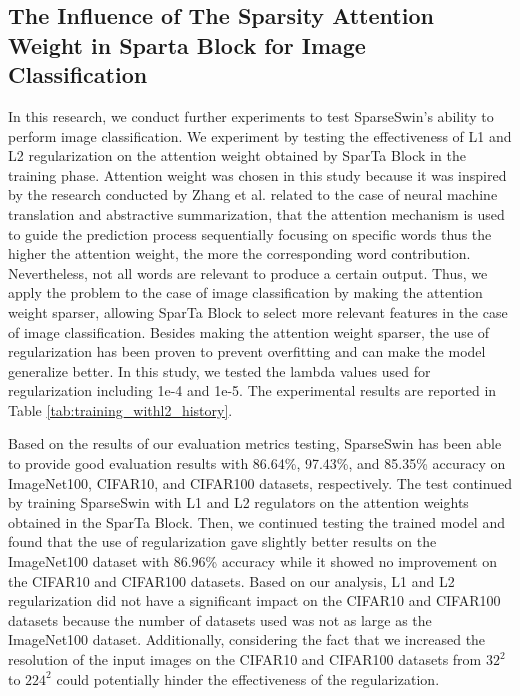 \documentclass[runningheads]{llncs}
\begin{document}
\subsection{The Influence of The Sparsity Attention Weight in Sparta Block for Image Classification}
\label{sec:influence_sparsity}
In this research, we conduct further experiments to test SparseSwin's ability to perform image classification. We experiment by testing the effectiveness of L1 \cite{tibshirani1996regression} and L2 \cite{golub1999tikhonov} regularization on the attention weight obtained by SparTa Block in the training phase. Attention weight was chosen in this study because it was inspired by the research conducted by Zhang et al. \cite{zhang2018attention} related to the case of neural machine translation and abstractive summarization, that the attention mechanism is used to guide the prediction process sequentially focusing on specific words thus the higher the attention weight, the more the corresponding word contribution. Nevertheless, not all words are relevant to produce a certain output. Thus, we apply the problem to the case of image classification by making the attention weight sparser, allowing SparTa Block to select more relevant features in the case of image classification. Besides making the attention weight sparser, the use of regularization has been proven to prevent overfitting and can make the model generalize better. In this study, we tested the lambda values used for regularization including 1e-4 and 1e-5. The experimental results are reported in Table \ref{tab:training_withl2_history}.

Based on the results of our evaluation metrics testing, SparseSwin has been able to provide good evaluation results with 86.64\%, 97.43\%, and 85.35\% accuracy on ImageNet100, CIFAR10, and CIFAR100 datasets, respectively. The test continued by training SparseSwin with L1 and L2 regulators on the attention weights obtained in the SparTa Block. Then, we continued testing the trained model and found that the use of regularization gave slightly better results on the ImageNet100 dataset with 86.96\% accuracy while it showed no improvement on the CIFAR10 and CIFAR100 datasets. Based on our analysis, L1 and L2 regularization did not have a significant impact on the CIFAR10 and CIFAR100 datasets because the number of datasets used was not as large as the ImageNet100 dataset. Additionally, considering the fact that we increased the resolution of the input images on the CIFAR10 and CIFAR100 datasets from $32^2$ to $224^2$ could potentially hinder the effectiveness of the regularization.
\end{document}
